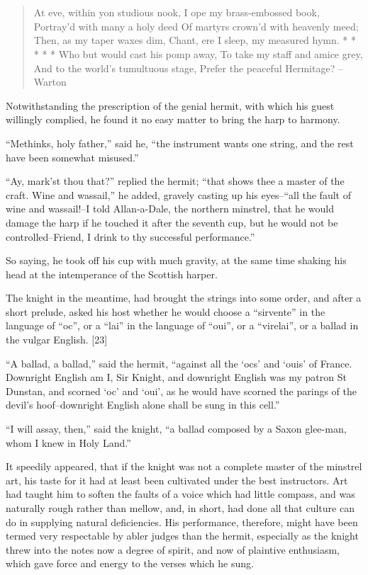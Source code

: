 \chapter{}

\begin{quote}
At eve, within yon studious nook,
I ope my brass-embossed book,
Portray'd with many a holy deed
Of martyrs crown'd with heavenly meed;
Then, as my taper waxes dim,
Chant, ere I sleep, my measured hymn.
* * * * *
Who but would cast his pomp away,
To take my staff and amice grey,
And to the world's tumultuous stage,
Prefer the peaceful Hermitage?
--Warton
\end{quote}

Notwithstanding the prescription of the genial hermit, with which his
guest willingly complied, he found it no easy matter to bring the harp
to harmony.

``Methinks, holy father,'' said he, ``the instrument wants one string,
and the rest have been somewhat misused.''

``Ay, mark'st thou that?'' replied the hermit; ``that shows thee a
master of the craft. Wine and wassail,'' he added, gravely casting up
his eyes--``all the fault of wine and wassail!--I told Allan-a-Dale, the
northern minstrel, that he would damage the harp if he touched it after
the seventh cup, but he would not be controlled--Friend, I drink to thy
successful performance.''

So saying, he took off his cup with much gravity, at the same time
shaking his head at the intemperance of the Scottish harper.

The knight in the meantime, had brought the strings into some order, and
after a short prelude, asked his host whether he would choose a
``sirvente'' in the language of ``oc'', or a ``lai'' in the language of
``oui'', or a ``virelai'', or a ballad in the vulgar English. {[}23{]}

``A ballad, a ballad,'' said the hermit, ``against all the `ocs' and
`ouis' of France. Downright English am I, Sir Knight, and downright
English was my patron St Dunstan, and scorned `oc' and `oui', as he
would have scorned the parings of the devil's hoof--downright English
alone shall be sung in this cell.''

``I will assay, then,'' said the knight, ``a ballad composed by a Saxon
glee-man, whom I knew in Holy Land.''

It speedily appeared, that if the knight was not a complete master of
the minstrel art, his taste for it had at least been cultivated under
the best instructors. Art had taught him to soften the faults of a voice
which had little compass, and was naturally rough rather than mellow,
and, in short, had done all that culture can do in supplying natural
deficiencies. His performance, therefore, might have been termed very
respectable by abler judges than the hermit, especially as the knight
threw into the notes now a degree of spirit, and now of plaintive
enthusiasm, which gave force and energy to the verses which he sung.


